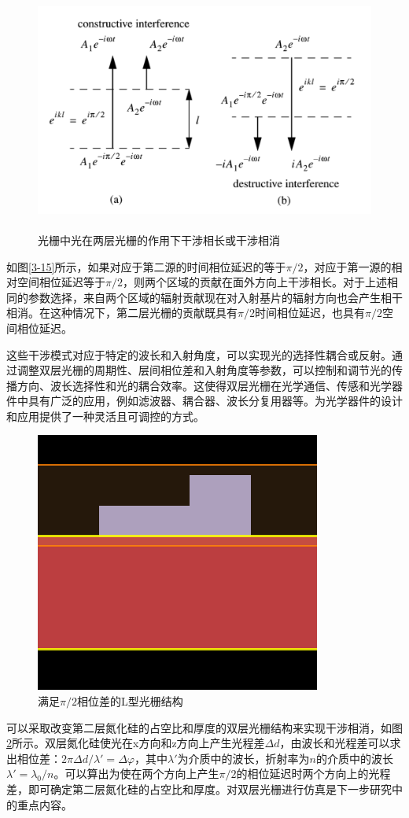 \documentclass[UTF8,a4paper,12pt]{ctexart}
\numberwithin{equation}{section}
\begin{document}
\begin{figure}[htbp]
\centering
\setcounter{figure}{0}
\includegraphics[height=8cm,width=13.5cm]{fig17.png}
\caption{光栅中光在两层光栅的作用下干涉相长或干涉相消}
\label{4-1}
\end{figure}

如图\ref{3-15}所示，如果对应于第二源的时间相位延迟的等于$\pi/2$，对应于第一源的相对空间相位延迟等于$\pi/2$，则两个区域的贡献在面外方向上干涉相长。对于上述相同的参数选择，来自两个区域的辐射贡献现在对入射基片的辐射方向也会产生相干相消。在这种情况下，第二层光栅的贡献既具有$\pi/2$时间相位延迟，也具有$\pi/2$空间相位延迟。

这些干涉模式对应于特定的波长和入射角度，可以实现光的选择性耦合或反射。通过调整双层光栅的周期性、层间相位差和入射角度等参数，可以控制和调节光的传播方向、波长选择性和光的耦合效率。这使得双层光栅在光学通信、传感和光学器件中具有广泛的应用，例如滤波器、耦合器、波长分复用器等。为光学器件的设计和应用提供了一种灵活且可调控的方式。
\begin{figure}[htbp]
\centering
\setcounter{figure}{1}
\includegraphics[width=0.4\linewidth]{fig32.png}
\caption{满足$\pi/2$相位差的L型光栅结构}
\label{4-2}
\end{figure}

可以采取改变第二层氮化硅的占空比和厚度的双层光栅结构来实现干涉相消，如图\ref{4-2}所示。双层氮化硅使光在x方向和z方向上产生光程差$\Delta d$，由波长和光程差可以求出相位差：$2\pi \Delta d/\lambda'=\Delta \varphi$，其中$\lambda'$为介质中的波长，折射率为$n$的介质中的波长$\lambda'=\lambda_0/n$。可以算出为使在两个方向上产生$\pi/2$的相位延迟时两个方向上的光程差，即可确定第二层氮化硅的占空比和厚度。对双层光栅进行仿真是下一步研究中的重点内容。
\end{document}
